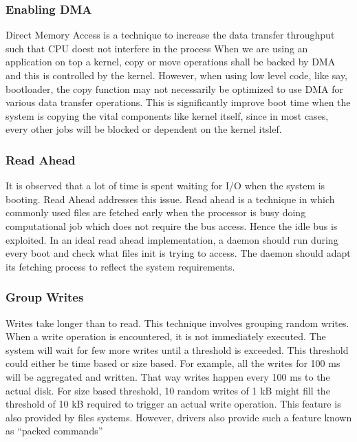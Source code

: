 \subsubsection{Enabling DMA}

Direct Memory Access is a technique to increase the data
transfer throughput such that CPU doest not interfere in the process
When we are using an application on top a kernel, copy or move operations
shall be backed by DMA and this is controlled by the kernel. 
However, when using low level code, like say, bootloader, the copy function
may not necessarily be optimized to use DMA for various data transfer
operations. This is significantly improve boot time when the system
is copying the vital components like kernel itself, since in most
cases, every other jobs will be blocked or dependent on the kernel
itslef.

\subsubsection{Read Ahead}

It is observed that a lot of time is spent waiting for I/O
when the system is booting. Read Ahead addresses this issue.
Read ahead is a technique in which commonly used files are
fetched early when the processor is busy doing computational job
which does not require the bus access. Hence the idle bus is
exploited. In an ideal read ahead implementation, a daemon should
run during every boot and check what files init is trying to access.
The daemon should adapt its fetching process to reflect the
system requirements.

\subsubsection{Group Writes}

Writes take longer than to read. This technique involves
grouping random writes. When a write operation is encountered,
it is not immediately executed. The system will wait for few more
writes until a threshold is exceeded. This threshold could either
be time based or size based. For example, all the writes for 100 ms
will be aggregated and written. That way writes happen every 100 ms
to the actual disk. For size based threshold, 10 random writes of 1 kB
might fill the threshold of 10 kB required to trigger an actual write
operation. This feature is also provided by files systems. However,
drivers also provide such a feature known as ``packed commands''

